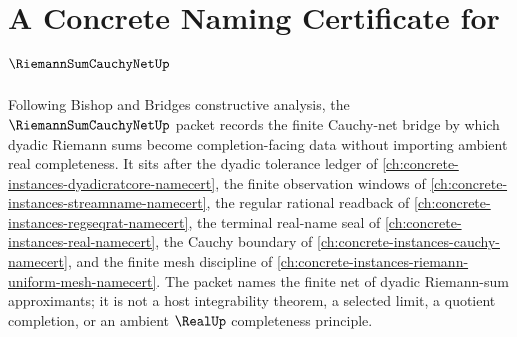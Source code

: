 \chapter{A Concrete Naming Certificate for $\RiemannSumCauchyNetUp$}
\label{ch:concrete-instances-riemann-sum-cauchy-net-namecert}

Following Bishop and Bridges constructive analysis, the $\RiemannSumCauchyNetUp$ packet records the finite Cauchy-net bridge by which dyadic Riemann sums become completion-facing data without importing ambient real completeness. It sits after the dyadic tolerance ledger of \autoref{ch:concrete-instances-dyadicratcore-namecert}, the finite observation windows of \autoref{ch:concrete-instances-streamname-namecert}, the regular rational readback of \autoref{ch:concrete-instances-regseqrat-namecert}, the terminal real-name seal of \autoref{ch:concrete-instances-real-namecert}, the Cauchy boundary of \autoref{ch:concrete-instances-cauchy-namecert}, and the finite mesh discipline of \autoref{ch:concrete-instances-riemann-uniform-mesh-namecert}. The packet names the finite net of dyadic Riemann-sum approximants; it is not a host integrability theorem, a selected limit, a quotient completion, or an ambient $\RealUp$ completeness principle.

